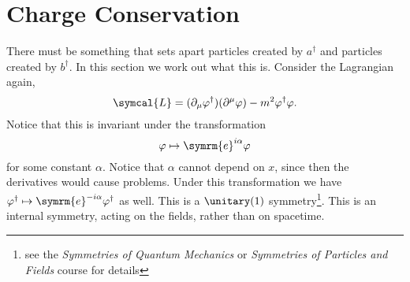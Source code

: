 \documentclass[fleqn]{NotesClass}
\newcommand*{\course}[1]{\textit{#1}}
\newcommand{\e}{\symrm{e}}
\newcommand{\lagrangianDensity}{\symcal{L}}
\newcommand{\hermit}{{\dagger}}
\begin{document}
    \section{Charge Conservation}
    There must be something that sets apart particles created by \(a^\hermit\) and particles created by \(b^\hermit\).
    In this section we work out what this is.
    Consider the Lagrangian again,
    \begin{equation}
        \lagrangianDensity = (\partial_\mu\varphi^\hermit)(\partial^\mu\varphi) - m^2\varphi^\hermit \varphi.
    \end{equation}
    Notice that this is invariant under the transformation
    \begin{equation}
        \varphi \mapsto \e^{i\alpha}\varphi
    \end{equation}
    for some constant \(\alpha\).
    Notice that \(\alpha\) cannot depend on \(x\), since then the derivatives would cause problems.
    Under this transformation we have \(\varphi^\hermit \mapsto \e^{-i\alpha}\varphi^\hermit\) as well.
    This is a \(\unitary(1)\) symmetry\footnote{see the \course{Symmetries of Quantum Mechanics} or \course{Symmetries of Particles and Fields} course for details}.
    This is an internal symmetry, acting on the fields, rather than on spacetime.
    
\end{document}
